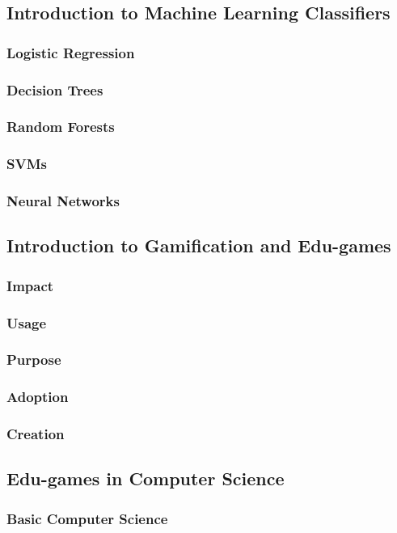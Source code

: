 \documentclass[a4paper,10pt]{article}
\begin{document}
\subsection{Introduction to Machine Learning Classifiers}
\subsubsection{Logistic Regression}
\subsubsection{Decision Trees}
\subsubsection{Random Forests}
\subsubsection{SVMs}
\subsubsection{Neural Networks}

\subsection{Introduction to Gamification and Edu-games}
\subsubsection{Impact}
\subsubsection{Usage}
\subsubsection{Purpose}
\subsubsection{Adoption}
\subsubsection{Creation}

\subsection{Edu-games in Computer Science}
\subsubsection{Basic Computer Science}
\end{document}
